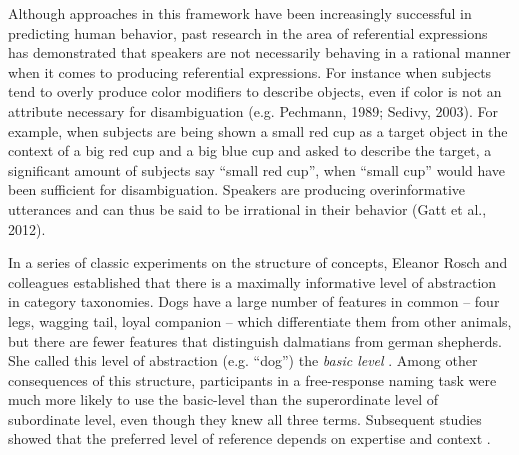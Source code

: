\documentclass[10pt,letterpaper]{article}
\begin{document}
Although approaches in this framework have been increasingly successful in predicting human behavior, past research in the area of referential expressions has demonstrated that speakers are not necessarily behaving in a rational manner when it comes to producing referential expressions. For instance when subjects tend to overly produce color modifiers to describe objects, even if color is not an attribute necessary for disambiguation (e.g. Pechmann, 1989; Sedivy, 2003). For example, when subjects are being shown a small red cup as a target object in the context of a big red cup and a big blue cup and asked to describe the target, a significant amount of subjects say ``small red cup'', when ``small cup'' would have been sufficient for disambiguation. Speakers are producing overinformative utterances and can thus be said to be irrational in their behavior (Gatt et al., 2012). 

In a series of classic experiments on the structure of concepts, Eleanor Rosch and colleagues established that there is a maximally informative level of abstraction in category taxonomies. Dogs have a large number of features in common -- four legs, wagging tail, loyal companion -- which differentiate them from other animals, but there are fewer features that distinguish dalmatians from german shepherds. She called this level of abstraction (e.g. ``dog'') the \emph{basic level} \cite{RoschEtAl76_BasicLevel}. Among other consequences of this structure, participants in a free-response naming task were much more likely to use the basic-level than the superordinate level of subordinate level, even though they knew all three terms. Subsequent studies showed that the preferred level of reference depends on expertise \cite{TanakaTaylor91_BasicLevelAndExpertise} and context \cite{JohnHampsonGoldbert91_BasicLevelPersonality}.


\end{document}
